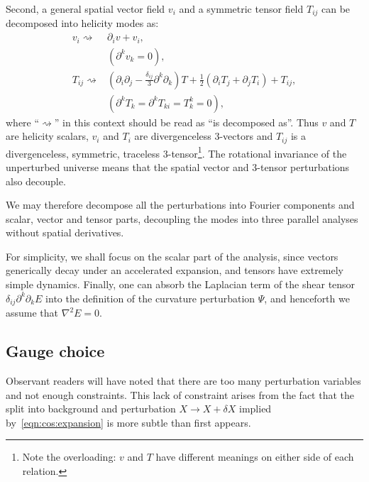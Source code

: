 Second, a general spatial vector field \(v_i\) and a symmetric tensor field \(T_{ij}\) can be decomposed into helicity modes as:
\begin{align}
  v_i \rightsquigarrow& \partial_i v + v_i   \nonumber,\\
  &(\partial^k v_k=0), \\
  T_{ij} \rightsquigarrow& (\partial_i\partial_j - \frac{\delta_{ij}}{3}\partial^k\partial_k)T + \frac{1}{2}(\partial_i T_j + \partial_j T_i) + T_{ij} \nonumber,\\ 
  &(\partial^k T_k = \partial^k T_{ki} = T^k_k = 0),
\end{align}
where ``\(\rightsquigarrow\)'' in this context should be read as ``is decomposed as''.
Thus \(v\) and \(T\) are helicity scalars, \(v_i\) and \(T_i\) are divergenceless 3-vectors and \(T_{ij}\) is a divergenceless, symmetric, traceless 3-tensor\footnote{Note the overloading: \(v\) and \(T\) have different meanings on either side of each relation.}.
  The rotational invariance of the unperturbed universe means that the spatial vector and 3-tensor perturbations also decouple.

We may therefore decompose all the perturbations into Fourier components and scalar, vector and tensor parts, decoupling the modes into three parallel analyses without spatial derivatives.

For simplicity, we shall focus on the scalar part of the analysis, since vectors generically decay under an accelerated expansion, and tensors have extremely simple dynamics. Finally, one can absorb the Laplacian term of the shear tensor \(\delta_{ij}\partial^k\partial_k E\) into the definition of the curvature perturbation \(\Psi\), and henceforth we assume that \(\nabla^2 E = 0\).

\subsection{Gauge choice}
Observant readers will have noted that there are too many perturbation variables and not enough constraints.
This lack of constraint arises from the fact that the split into background and perturbation \(X\to X+\delta X\) implied by~\eqref{eqn:cos:expansion} is more subtle than first appears. 

